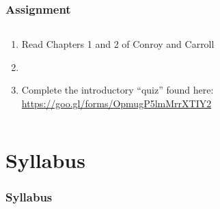 \documentclass[color=usenames,dvipsnames]{beamer}
\begin{document}
\begin{frame}
  \frametitle{Assignment}
  \begin{columns}
    \begin{column}{0.6\textwidth}
      \large
      \begin{enumerate}[\bf (1)]
        \item<1-> Read Chapters 1 and 2 of Conroy and Carroll
        \item[]
        \item<1-> Complete the introductory ``quiz'' found here: \\
          \tiny \url{https://goo.gl/forms/OpmugP5lmMrrXTIY2}
      \end{enumerate}
    \end{column}
    \begin{column}{0.4\textwidth}
    \end{column}
  \end{columns}
\end{frame}







\section{Syllabus}


\begin{frame}
  \frametitle{Syllabus}
  \begin{columns}%
    \begin{column}{0.5\textwidth}
    \end{column}
  \end{columns}
\end{frame}
\end{document}
